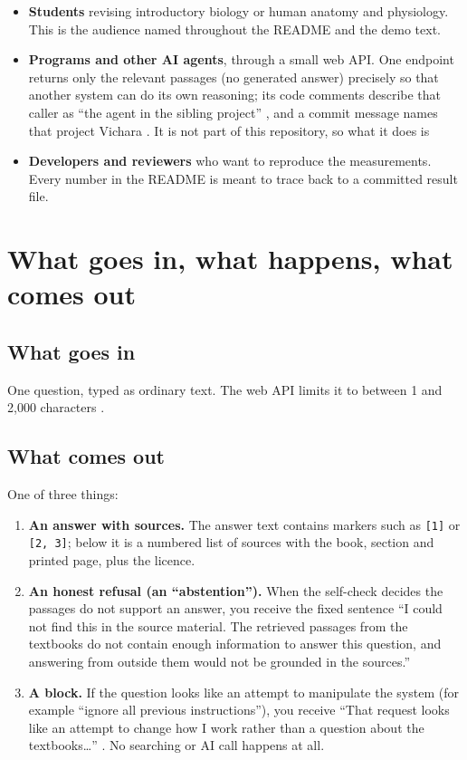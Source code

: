 \begin{itemize}
  \item \textbf{Students} revising introductory biology or human anatomy and physiology. This is the audience named throughout the README and the demo text.
  \item \textbf{Programs and other AI agents}, through a small web API. One endpoint returns only the relevant passages (no generated answer) precisely so that another system can do its own reasoning; its code comments describe that caller as ``the agent in the sibling project'' , and a commit message names that project Vichara . It is not part of this repository, so what it does is \NotDet
  \item \textbf{Developers and reviewers} who want to reproduce the measurements. Every number in the README is meant to trace back to a committed result file.
\end{itemize}

\section{What goes in, what happens, what comes out}

\subsection{What goes in}
One question, typed as ordinary text. The web API limits it to between 1 and 2,000 characters .

\subsection{What comes out}
One of three things:
\begin{enumerate}
  \item \textbf{An answer with sources.} The answer text contains markers such as \texttt{[1]} or \texttt{[2, 3]}; below it is a numbered list of sources with the book, section and printed page, plus the licence.
  \item \textbf{An honest refusal (an ``abstention'').} When the self-check decides the passages do not support an answer, you receive the fixed sentence \enquote{I could not find this in the source material. The retrieved passages from the textbooks do not contain enough information to answer this question, and answering from outside them would not be grounded in the sources.}
  \item \textbf{A block.} If the question looks like an attempt to manipulate the system (for example ``ignore all previous instructions''), you receive \enquote{That request looks like an attempt to change how I work rather than a question about the textbooks\ldots} . No searching or AI call happens at all.
\end{enumerate}

